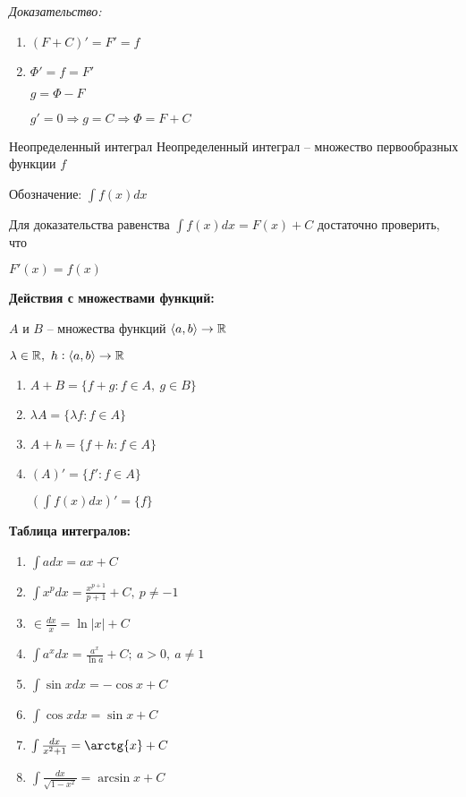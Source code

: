 \documentclass[12pt]{article}
\begin{document}
\textit{Доказательство:}

\begin{enumerate}
    \item $(F + C)' = F' = f$
    \item $\Phi' = f = F'$
    
    $g = \Phi - F$

    $g' = 0 \Rightarrow g = C \Rightarrow \Phi = F + C$
\end{enumerate}

\begin{defin}{Неопределенный интеграл}
    Неопределенный интеграл -- множество первообразных функции $f$

    Обозначение: $\int f(x)dx$
\end{defin}

\begin{Remark}{}
    Для доказательства равенства $\int f(x)dx = F(x) + C$ достаточно проверить, что 
    
    $F'(x) = f(x)$
\end{Remark}

\textbf{Действия с множествами функций:}

$A$ и $B$ -- множества функций $\langle a, b \rangle \rightarrow \mathbb R$

$\lambda \in \mathbb R,\ h : \langle a, b \rangle \rightarrow \mathbb R$

\begin{enumerate}
    \item $A + B = \{f + g : f \in A,\ g \in B\}$
    \item $\lambda A = \{\lambda f : f \in A\}$
    \item $A + h = \{f + h : f \in A\}$
    \item $(A)' = \{f' : f \in A\}$
    
    \begin{Example}{}
        $(\int f(x)dx)' = \{ f \}$
    \end{Example}
\end{enumerate}

\textbf{Таблица интегралов:}

\begin{enumerate}
    \item $\int adx = ax + C$
    \item $\int x^pdx = \frac{x^{p + 1}}{p + 1} + C,\ p \neq -1$
    \item $\in \frac{dx}{x} = \ln{|x|} + C$
    \item $\int a^xdx = \frac{a^x}{\ln{a}} + C;\ a > 0,\ a \neq 1$
    \item $\int \sin{x}dx = -\cos{x} + C$
    \item $\int \cos{x}dx = \sin{x} + C$
    \item $\int \frac{dx}{x^2 + 1} = \arctg{x} + C$
    \item $\int \frac{dx}{\sqrt{1 - x^2}} = \arcsin{x} + C$
\end{enumerate}
\end{document}
